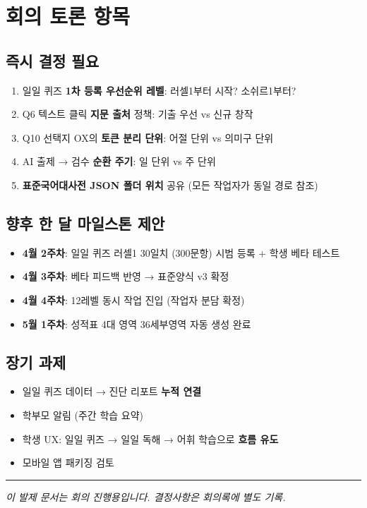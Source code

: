 \documentclass[11pt,a4paper]{article}
\begin{document}
\section{회의 토론 항목}

\subsection{즉시 결정 필요}

\begin{enumerate}
  \item 일일 퀴즈 \textbf{1차 등록 우선순위 레벨}: 러셀1부터 시작? 소쉬르1부터?
  \item Q6 텍스트 클릭 \textbf{지문 출처} 정책: 기출 우선 vs 신규 창작
  \item Q10 선택지 OX의 \textbf{토큰 분리 단위}: 어절 단위 vs 의미구 단위
  \item AI 출제 → 검수 \textbf{순환 주기}: 일 단위 vs 주 단위
  \item \textbf{표준국어대사전 JSON 폴더 위치} 공유 (모든 작업자가 동일 경로 참조)
\end{enumerate}

\subsection{향후 한 달 마일스톤 제안}

\begin{itemize}
  \item \textbf{4월 2주차}: 일일 퀴즈 러셀1 30일치 (300문항) 시범 등록 + 학생 베타 테스트
  \item \textbf{4월 3주차}: 베타 피드백 반영 → 표준양식 v3 확정
  \item \textbf{4월 4주차}: 12레벨 동시 작업 진입 (작업자 분담 확정)
  \item \textbf{5월 1주차}: 성적표 4대 영역 36세부영역 자동 생성 완료
\end{itemize}

\subsection{장기 과제}

\begin{itemize}
  \item 일일 퀴즈 데이터 → 진단 리포트 \textbf{누적 연결}
  \item 학부모 알림 (주간 학습 요약)
  \item 학생 UX: 일일 퀴즈 → 일일 독해 → 어휘 학습으로 \textbf{흐름 유도}
  \item 모바일 앱 패키징 검토
\end{itemize}

\vspace{1cm}
\hrule
\vspace{0.4cm}
\noindent\textit{이 발제 문서는 회의 진행용입니다. 결정사항은 회의록에 별도 기록.}
\end{document}
